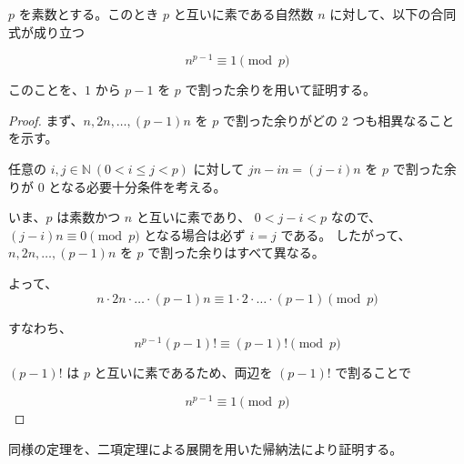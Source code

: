 %

\begin{theorem}
$p$ を素数とする。このとき $p$ と互いに素である自然数 $n$ に対して、以下の合同式が成り立つ

\[
n^{p-1} \equiv 1 \pmod{p}
\]

このことを、$1$ から $p-1$ を $p$ で割った余りを用いて証明する。
\end{theorem}

\begin{proof}

まず、$n, 2n, \ldots, (p-1)n$ を $p$ で割った余りがどの 2 つも相異なることを示す。

任意の $i, j \in \mathbb{N}\ (0 < i \leq j < p)$ に対して $jn - in = (j - i)n$ を $p$ で割った余りが $0$ となる必要十分条件を考える。

いま、$p$ は素数かつ $n$ と互いに素であり、 $0 < j - i < p$ なので、
$(j - i)n \equiv 0 \pmod{p}$ となる場合は必ず $i = j$ である。
したがって、$n, 2n, \ldots, (p-1)n$ を $p$ で割った余りはすべて異なる。

よって、
\[
n \cdot 2n \cdot \ldots \cdot (p-1)n \equiv 1 \cdot 2 \cdot \ldots \cdot (p-1) \pmod{p}
\]

すなわち、
\[
n^{p-1}(p-1)! \equiv (p-1)! \pmod{p}
\]

$(p-1)!$ は $p$ と互いに素であるため、両辺を $(p-1)!$ で割ることで

\[
n^{p-1} \equiv 1 \pmod{p}
\]

\end{proof}

\begin{theorem}

同様の定理を、二項定理による展開を用いた帰納法により証明する。

\end{theorem}

